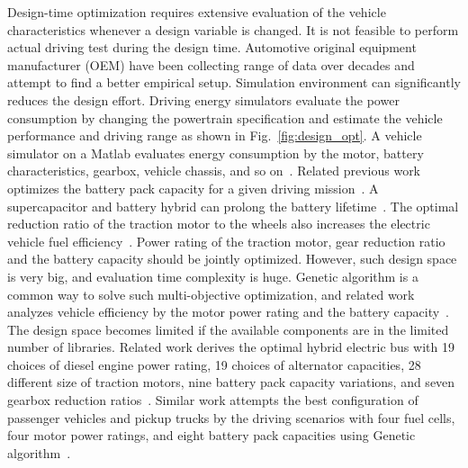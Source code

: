 Design-time optimization requires extensive evaluation of the vehicle characteristics whenever a design variable is changed. It is not feasible to perform actual driving test during the design time. Automotive original equipment manufacturer (OEM) have been collecting range of data over decades and attempt to find a better empirical setup. Simulation environment can significantly reduces the design effort. Driving energy simulators evaluate the power consumption by changing the powertrain specification and estimate the vehicle performance and driving range as shown in Fig.~\ref{fig:design_opt}. A vehicle simulator on a Matlab evaluates energy consumption by the motor, battery characteristics, gearbox, vehicle chassis, and so on~\cite{Butler:TVT99,Markel:JPS02}. Related previous work optimizes the battery pack capacity for a given driving mission~\cite{Gao:TIE10}. A supercapacitor and battery hybrid can prolong the battery lifetime~\cite{Song:AE14}. The optimal reduction ratio of the traction motor to the wheels also increases the electric vehicle fuel efficiency~\cite{Yin:ITEC-AP14}. Power rating of the traction motor, gear reduction ratio and the battery capacity should be jointly optimized. However, such design space is very big, and evaluation time complexity is huge. Genetic algorithm is a common way to solve such multi-objective optimization, and related work analyzes vehicle efficiency by the motor power rating and the battery capacity~\cite{Pozo:AMAA15}. The design space becomes limited if the available components are in the limited number of libraries. Related work derives the optimal hybrid electric bus with 19 choices of diesel engine power rating, 19 choices of alternator capacities, 28 different size of traction motors, nine battery pack capacity variations, and seven gearbox reduction ratios~\cite{Hasanzadeh:INDEL14}. Similar work attempts the best configuration of passenger vehicles and pickup trucks by the driving scenarios with four fuel cells, four motor power ratings, and eight battery pack capacities using Genetic algorithm~\cite{Ribau:AE14}.


